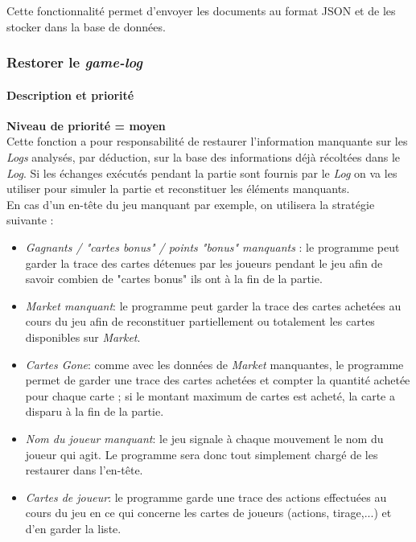 Cette fonctionnalité permet d'envoyer les documents au format JSON et de les stocker dans la base de données. 



\subsubsection{Restorer le \textit{game-log}}
\paragraph*{Description et priorité}
\textbf{Niveau de priorité = moyen}\\

Cette fonction a pour responsabilité de restaurer l'information manquante sur les \textit{Logs} analysés, par déduction, sur la base des informations déjà récoltées dans le \textit{Log}. Si les échanges exécutés pendant la partie sont fournis par le \textit{Log} on va les utiliser pour simuler la partie et reconstituer les éléments manquants. \\

En cas d'un en-tête du jeu manquant par exemple, on utilisera la stratégie suivante :
  \begin{itemize}
\item \textit{Gagnants / "cartes bonus" / points "bonus" manquants }: le programme peut garder la trace des cartes détenues par les joueurs pendant le jeu afin de savoir combien de "cartes bonus" ils ont à la fin de la partie.
\item \textit\textit{{Market} manquant}: le programme peut garder la trace des cartes achetées au cours du jeu afin de reconstituer partiellement ou totalement les cartes disponibles sur \textit{Market}.
\item \textit{Cartes \textit{Gone}}: comme avec les données de \textit{Market} manquantes, le programme permet de garder une trace des cartes achetées et compter la quantité achetée pour chaque carte ; si le montant maximum de cartes est acheté, la carte a disparu à la fin de la partie.
\item \textit{Nom du joueur manquant}: le jeu signale à chaque mouvement le nom du joueur qui agit. Le programme sera donc tout simplement chargé de les restaurer dans l'en-tête.
\item \textit{Cartes de joueur}: le programme garde une trace des actions effectuées au cours du jeu en ce qui concerne les cartes de joueurs (actions, tirage,...) et d'en garder la liste.
  \end{itemize}


